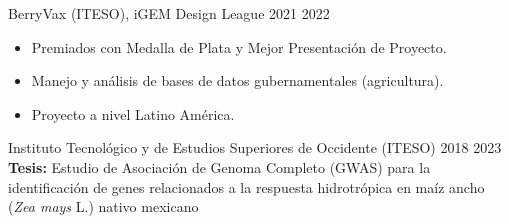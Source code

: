 \documentclass{simplecv}
\begin{document}
    {BerryVax (ITESO), iGEM Design League}
    {}
    {2021}
    {2022}
    {
        \vspace{-11pt}
        \begin{itemize}[leftmargin=*]
        \setlength{\itemsep}{0cm}
          \item Premiados con Medalla de Plata y Mejor Presentación de Proyecto.
          \item Manejo y análisis de bases de datos gubernamentales (agricultura).
          \item Proyecto a nivel Latino América.
        \end{itemize}
    }
    

\vspace{0.5em}
    {Instituto Tecnológico y de Estudios Superiores de Occidente (ITESO)} %
    {} %
    {2018} %
    {2023} %
    {
        \textbf{Tesis:} {Estudio de Asociación de Genoma Completo (GWAS) para la identificación de genes relacionados a la respuesta hidrotrópica en maíz ancho (\textit{Zea mays} L.) nativo mexicano}
    } %
    
\end{document}
